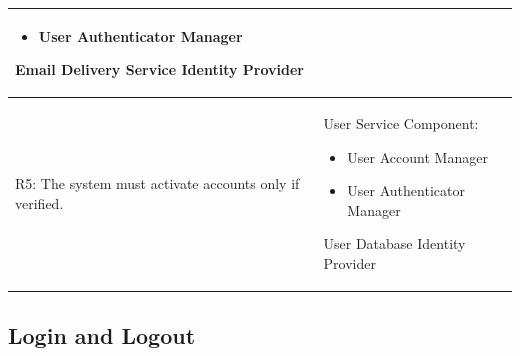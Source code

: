 \begin{table}[ht]
\begin{tabular}{|p{9cm}|p{6cm}|}
\begin{itemize}
  \item User Authenticator Manager
\end{itemize}
Email Delivery Service
\newline
Identity Provider
\\ \hline
R5: The system must activate accounts only if verified. 
&
User Service Component: 
\begin{itemize}
  \item User Account Manager
  \item User Authenticator Manager
\end{itemize}
User Database
\newline
Identity Provider
\\ \hline
\end{tabular}
\end{table}
\newpage
\subsection{Login and Logout}
